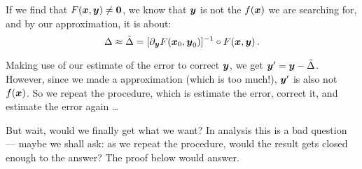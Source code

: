 \documentclass[openany]{book}
\begin{document}
If we find that $F(\boldsymbol{x}, \boldsymbol{y}) \neq \boldsymbol{0}$, we know that $\boldsymbol{y}$ is not the $f(\boldsymbol{x})$ we are searching for, and by our approximation, it is about:
\begin{equation*}
	\Delta \approx \tilde{\Delta} = [\partial_{\boldsymbol{y}} F(\boldsymbol{x}_0, \boldsymbol{y}_0)]^{-1} \circ F(\boldsymbol{x}, \boldsymbol{y})\,.
\end{equation*}

Making use of our estimate of the error to correct $\boldsymbol{y}$, we get $\boldsymbol{y}' = \boldsymbol{y} - \tilde \Delta$. 
However, since we made a approximation (which is too much!), $\boldsymbol{y}'$ is also not $f(\boldsymbol{x})$. So we repeat the procedure, which is estimate the error, correct it, and estimate the error again \ldots

But wait, would we finally get what we want? 
In analysis this is a bad question --- maybe we shall ask: as we repeat the procedure, would the result gets closed enough to the answer? 
The proof below would answer.
\end{document}
